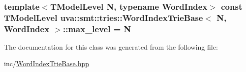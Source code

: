 \subsubsection[{max\+\_\+level}]{\setlength{\rightskip}{0pt plus 5cm}template$<$T\+Model\+Level N, typename Word\+Index$>$ const {\bf T\+Model\+Level} {\bf uva\+::smt\+::tries\+::\+Word\+Index\+Trie\+Base}$<$ N, Word\+Index $>$\+::max\+\_\+level = N\hspace{0.3cm}{\ttfamily [static]}}\label{classuva_1_1smt_1_1tries_1_1_word_index_trie_base_ac2a30fb4bcc07b5460ec70ee72d81efe}


The documentation for this class was generated from the following file\+:\begin{DoxyCompactItemize}
\item 
inc/\hyperlink{_word_index_trie_base_8hpp}{Word\+Index\+Trie\+Base.\+hpp}\end{DoxyCompactItemize}
